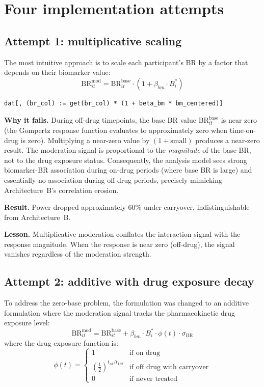 \documentclass[11pt]{article}
\begin{document}
\section{Four implementation attempts}

\subsection{Attempt 1: multiplicative scaling}

The most intuitive approach is to scale each participant's
BR by a factor that depends on their biomarker value:
%
\begin{equation}
  \text{BR}_{it}^{\text{mod}} = \text{BR}_{it}^{\text{base}}
  \cdot (1 + \beta_{bm} \cdot B_i^{*})
\end{equation}

\begin{lstlisting}
dat[, (br_col) := get(br_col) * (1 + beta_bm * bm_centered)]
\end{lstlisting}

\textbf{Why it fails.} During off-drug timepoints, the base
BR value $\text{BR}_{it}^{\text{base}}$ is near zero (the
Gompertz response function evaluates to approximately zero
when time-on-drug is zero). Multiplying a near-zero value by
$(1 + \text{small})$ produces a near-zero result. The
moderation signal is proportional to the \emph{magnitude} of
the base BR, not to the drug exposure status. Consequently,
the analysis model sees strong biomarker-BR association during
on-drug periods (where base BR is large) and essentially no
association during off-drug periods, precisely mimicking
Architecture~B's correlation erosion.

\textbf{Result.} Power dropped approximately 60\% under
carryover, indistinguishable from Architecture~B.

\textbf{Lesson.} Multiplicative moderation conflates the
interaction signal with the response magnitude. When the
response is near zero (off-drug), the signal vanishes
regardless of the moderation strength.

\subsection{Attempt 2: additive with drug exposure decay}

To address the zero-base problem, the formulation was changed to an additive
formulation where the moderation signal tracks the
pharmacokinetic drug exposure level:
%
\begin{equation}
  \text{BR}_{it}^{\text{mod}} = \text{BR}_{it}^{\text{base}}
  + \beta_{bm} \cdot B_i^{*} \cdot \phi(t) \cdot \sigma_{\text{BR}}
\end{equation}
%
where the drug exposure function is:
%
\begin{equation}
  \phi(t) =
  \begin{cases}
    1 & \text{if on drug} \\
    \left(\tfrac{1}{2}\right)^{t_{sd} / t_{1/2}} &
      \text{if off drug with carryover} \\
    0 & \text{if never treated}
  \end{cases}
\end{equation}
\end{document}
